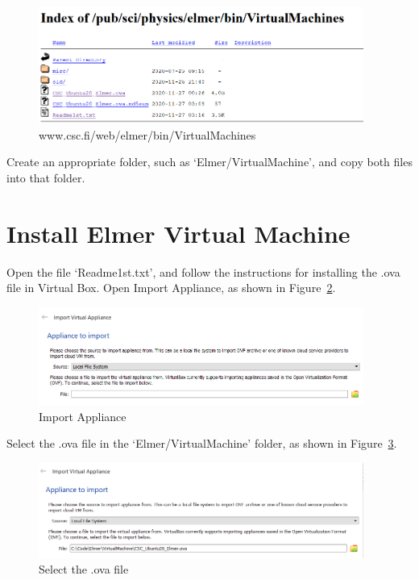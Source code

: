 \begin{figure}[H]
\begin{center}
\includegraphics[width=0.95\textwidth]{virt-1}
\caption{www.csc.fi/web/elmer/bin/VirtualMachines}\label{fg:virt-1}
\end{center}
\end{figure}

Create an appropriate folder, such as `Elmer/VirtualMachine', and copy both files into that folder.  

\section{Install Elmer Virtual Machine}

Open the file `Readme1st.txt', and follow the instructions for installing the .ova file in Virtual Box.  Open Import Appliance, as shown in Figure~\ref{fg:virt-2}.

\begin{figure}[H]
\begin{center}
\includegraphics[width=0.95\textwidth]{virt-2}
\caption{Import Appliance}\label{fg:virt-2}
\end{center}
\end{figure}

Select the .ova file in the `Elmer/VirtualMachine' folder, as shown in Figure~\ref{fg:virt-3}. 

\begin{figure}[H]
\begin{center}
\includegraphics[width=0.95\textwidth]{virt-3}
\caption{Select the .ova file}\label{fg:virt-3}
\end{center}
\end{figure}

